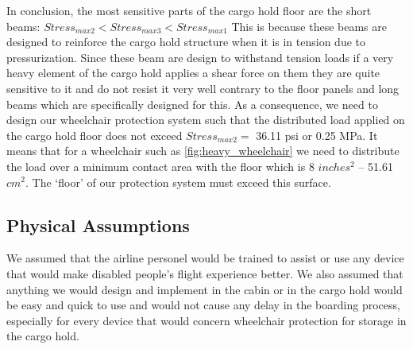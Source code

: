 In conclusion, the most sensitive parts of the cargo hold floor are the short beams:
$Stress_{max 2} < Stress_{max 3} < Stress_{max 1}$
 This is because these beams are designed to reinforce the cargo hold structure when it is in tension due to pressurization. Since these beam are design to withstand tension loads if a very heavy element of the cargo hold applies a shear force on them they are quite sensitive to it and do not resist it very well contrary to the floor panels and long beams which are specifically designed for this.
As a consequence, we need to design our wheelchair protection system such that the distributed load applied on the cargo hold floor does not exceed $ Stress_{max 2} =$ 36.11 psi or 0.25 MPa. It means that for a wheelchair such as \ref{fig:heavy_wheelchair} we need to distribute the load over a minimum contact area with the floor which is 8 $inches^2$ – 51.61 $cm^2$. The ‘floor’ of our protection system must exceed this surface.

\subsection{Physical Assumptions}

We assumed that the airline personel would be trained to assist or use any device that would make disabled people's flight experience better. We also assumed that anything we would design and implement in the cabin or in the cargo hold would be easy and quick to use and would not cause any delay in the boarding process, especially for every device that would concern wheelchair protection for storage in the cargo hold.

